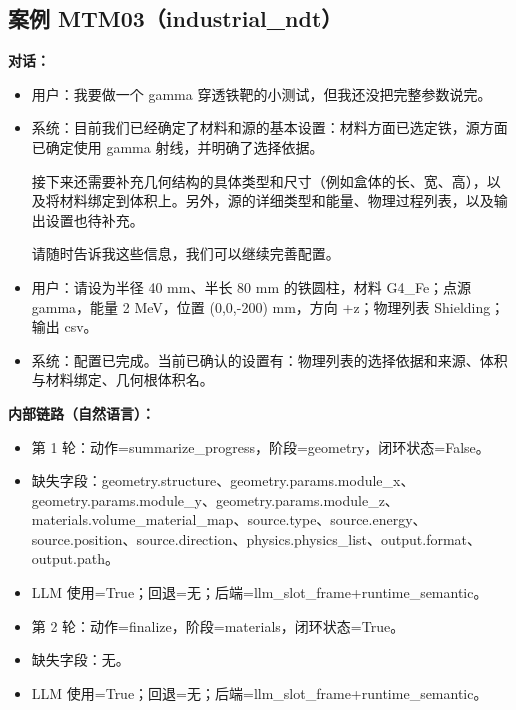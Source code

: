 \documentclass[11pt]{ctexart}
\begin{document}
\subsection{案例 MTM03（industrial\_ndt）}
\textbf{对话：}
\begin{itemize}
\item 用户：我要做一个 gamma 穿透铁靶的小测试，但我还没把完整参数说完。
\item 系统：目前我们已经确定了材料和源的基本设置：材料方面已选定铁，源方面已确定使用 gamma 射线，并明确了选择依据。

接下来还需要补充几何结构的具体类型和尺寸（例如盒体的长、宽、高），以及将材料绑定到体积上。另外，源的详细类型和能量、物理过程列表，以及输出设置也待补充。

请随时告诉我这些信息，我们可以继续完善配置。
\item 用户：请设为半径 40 mm、半长 80 mm 的铁圆柱，材料 G4\_Fe；点源 gamma，能量 2 MeV，位置 (0,0,-200) mm，方向 +z；物理列表 Shielding；输出 csv。
\item 系统：配置已完成。当前已确认的设置有：物理列表的选择依据和来源、体积与材料绑定、几何根体积名。
\end{itemize}
\textbf{内部链路（自然语言）：}
\begin{itemize}
\item 第 1 轮：动作=summarize\_progress，阶段=geometry，闭环状态=False。
\item 缺失字段：geometry.structure、geometry.params.module\_x、geometry.params.module\_y、geometry.params.module\_z、materials.volume\_material\_map、source.type、source.energy、source.position、source.direction、physics.physics\_list、output.format、output.path。
\item LLM 使用=True；回退=无；后端=llm\_slot\_frame+runtime\_semantic。
\item 第 2 轮：动作=finalize，阶段=materials，闭环状态=True。
\item 缺失字段：无。
\item LLM 使用=True；回退=无；后端=llm\_slot\_frame+runtime\_semantic。
\end{itemize}
\end{document}
